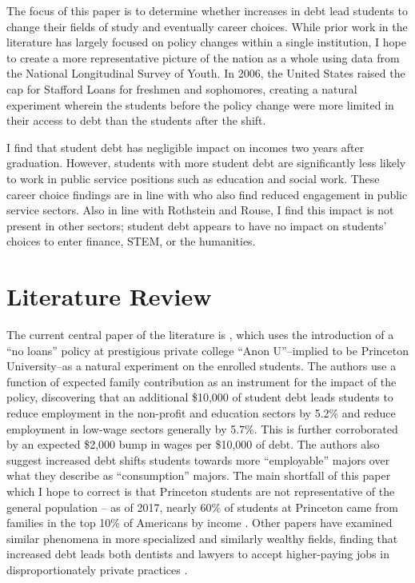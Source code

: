\documentclass{article}
\begin{document}
	The focus of this paper is to determine whether increases in debt lead students to change their fields of study and eventually career choices. While prior work in the literature has largely focused on policy changes within a single institution, I hope to create a more representative picture of the nation as a whole using data from the National Longitudinal Survey of Youth. In 2006, the United States raised the cap for Stafford Loans for freshmen and sophomores, creating a natural experiment wherein the students before the policy change were more limited in their access to debt than the students after the shift.
	
	I find that student debt has negligible impact on incomes two years after graduation. However, students with more student debt are significantly less likely to work in public service positions such as education and social work. These career choice findings are in line with \textcite{rothstein2011} who also find reduced engagement in public service sectors. Also in line with Rothstein and Rouse, I find this impact is not present in other sectors; student debt appears to have no impact on students' choices to enter finance, STEM, or the humanities. 
	
	\section{Literature Review}
	
	The current central paper of the literature is \textcite{rothstein2011}, which uses the introduction of a ``no loans'' policy at prestigious private college ``Anon U''--implied to be Princeton University--as a natural experiment on the enrolled students. The authors use a function of expected family contribution as an instrument for the impact of the policy, discovering that an additional \$10,000 of student debt leads students to reduce employment in the non-profit and education sectors by 5.2\% and reduce employment in low-wage sectors generally by 5.7\%. This is further corroborated by an expected \$2,000 bump in wages per \$10,000 of debt. The authors also suggest increased debt shifts students towards more ``employable'' majors over what they describe as ``consumption'' majors. The main shortfall of this paper which I hope to correct is that Princeton students are not representative of the general population -- as of 2017, nearly 60\% of students at Princeton came from families in the top 10\% of Americans by income \parencite{aisch2017}. Other papers have examined similar phenomena in more specialized and similarly wealthy fields, finding that increased debt leads both dentists and lawyers to accept higher-paying jobs in disproportionately private practices \parencite{nicholson2015, field2009}.
	
\end{document}
